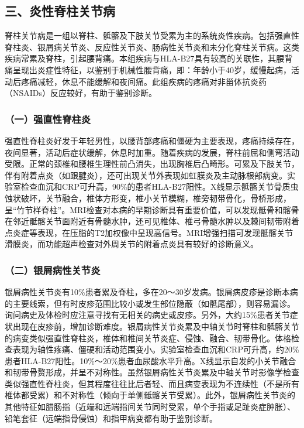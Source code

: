 \subsection{三、炎性脊柱关节病}

脊柱关节病是一组以脊柱、骶髂及下肢关节受累为主的系统炎性疾病。包括强直性脊柱炎、银屑病关节炎、反应性关节炎、肠病性关节炎和未分化脊柱关节病。这类疾病常累及脊柱，引起腰背痛。本组疾病与HLA-B27具有较高的关联性，其腰背痛呈现出炎症性特征，以鉴别于机械性腰背痛，即：年龄小于40岁，缓慢起病，活动后疼痛减轻，休息不能缓解和夜间痛。此组疾病的疼痛对非甾体抗炎药（NSAIDs）反应较好，有助于鉴别诊断。

\subsubsection{（一）强直性脊柱炎}

强直性脊柱炎好发于年轻男性，以腰背部疼痛和僵硬为主要表现，疼痛持续存在，夜间显著，活动后症状缓解，休息时加重。随着疾病的发展，脊柱前屈和侧弯活动受限。正常的颈椎和腰椎生理性前凸消失，出现胸椎后凸畸形。可累及下肢关节，伴有附着点炎（如跟腱炎），还可出现关节外表现如虹膜炎及主动脉根部病变。实验室检查血沉和CRP可升高，90\%的患者HLA-B27阳性。X线显示骶髂关节骨质虫蚀状破坏，关节融合，椎体方形变，椎小关节模糊，椎旁韧带骨化，骨桥形成，呈“竹节样脊柱”。MRI检查对本病的早期诊断具有重要价值，可以发现骶骨和髂骨在邻近骶髂关节面附近有骨髓水肿，还可见椎体、椎弓骨髓水肿以及棘间韧带附着点炎症等表现，在压脂的T2加权像中呈现高信号。MRI增强扫描可发现骶髂关节滑膜炎，而功能超声检查对外周关节的附着点炎具有较好的诊断意义。

\subsubsection{（二）银屑病性关节炎}

银屑病性关节炎有10\%患者累及脊柱，多在20～30岁发病。银屑病皮疹是诊断本病的主要线索，但有时皮疹范围比较小或发生部位隐蔽（如骶尾部），则容易漏诊。询问病史及体检时应注意寻找有无相关的病史或皮疹。另外，大约15\%患者关节症状出现在皮疹前，增加诊断难度。银屑病性关节炎累及中轴关节时脊柱和骶髂关节的病变类似强直性脊柱炎，椎体和椎间关节炎症、侵蚀、融合、韧带骨化。体格检查表现为轴性疼痛、僵硬和活动范围变小。实验室检查血沉和CRP可升高，约20\%患者HLA-B27阳性。10\%～20\%患者血尿酸水平升高。X线显示自发的小关节融合和韧带骨赘形成，并呈不对称性。虽然银屑病性关节炎累及中轴关节时影像学检查类似强直性脊柱炎，但其程度往往比后者轻、而且病变表现为不连续性（不是所有椎体都受累）和不对称性（倾向于单侧骶髂关节受累）。此外，银屑病性关节炎的其他特征如腊肠指（近端和远端指间关节同时受累，单个手指或足趾炎症肿胀）、铅笔套征（远端指骨侵蚀）和指甲病变都有助于鉴别诊断。

